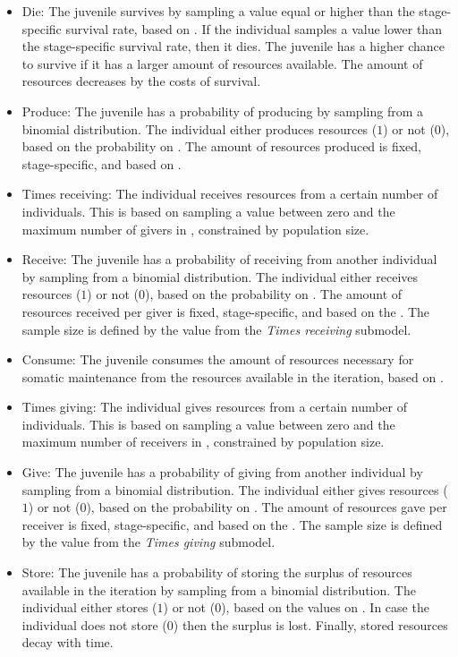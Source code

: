 \documentclass{article}
\begin{document}
\begin{itemize}
\begin{itemize}
        \item Die: The juvenile survives by sampling a value equal or higher than the stage-specific survival rate, based on \cite{gurven2007longevity}. If the individual samples a value lower than the stage-specific survival rate, then it dies. The juvenile has a higher chance to survive if it has a larger amount of resources available. The amount of resources decreases by the costs of survival.
        \item Produce: The juvenile has a probability of producing by sampling from a binomial distribution. The individual either produces resources ($1$) or not ($0$), based on the probability on \cite{koster2020life}. The amount of resources produced is fixed, stage-specific, and based on \cite{koster2020life}.
        \item Times receiving: The individual receives resources from a certain number of individuals. This is based on sampling a value between zero and the maximum number of givers in \cite{gurven2004give}, constrained by population size.
        \item Receive: The juvenile has a probability of receiving from another individual by sampling from a binomial distribution. The individual either receives resources ($1$) or not ($0$), based on the probability on \cite{gurven2004give}. The amount of resources received per giver is fixed, stage-specific, and based on the \cite{gurven2004give}. The sample size is defined by the value from the \emph{Times receiving} submodel. 
        \item Consume: The juvenile consumes the amount of resources necessary for somatic maintenance from the resources available in the iteration, based on \cite{kaplan2000theory}.
        \item Times giving: The individual gives resources from a certain number of individuals. This is based on sampling a value between zero and the maximum number of receivers in \cite{gurven2004give}, constrained by population size.
        \item Give: The juvenile has a probability of giving from another individual by sampling from a binomial distribution. The individual either gives resources ($1$) or not ($0$), based on the probability on \cite{gurven2004give}. The amount of resources gave per receiver is fixed, stage-specific, and based on the \cite{gurven2004give}. The sample size is defined by the value from the \emph{Times giving} submodel. 
        \item Store: The juvenile has a probability of storing the surplus of resources available in the iteration by sampling from a binomial distribution. The individual either stores ($1$) or not ($0$), based on the values on \citep{bowles2011cultivation}. In case the individual does not store ($0$) then the surplus is lost. Finally, stored resources decay with time.

\end{itemize}
\end{itemize}
\end{document}
